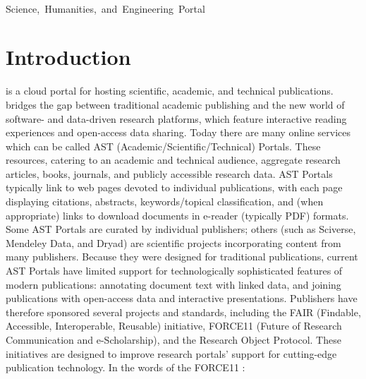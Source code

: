 \documentclass[10pt,letterpaper]{article}
\begin{document}
\vspace*{-6em}

\begin{center}
{}\\
\vspace{8pt}
\mbox{{\Large Science, Humanities, and Engineering Portal}}\\\vspace{3pt}
\end{center}

\vspace*{-2em}


\section{Introduction}
{\lfMOSAIC} is a cloud portal for hosting scientific, academic, and 
technical publications.  {\MOSAIC} bridges the gap between 
traditional academic publishing and the new 
world of software- and data-driven research platforms, 
which feature interactive reading experiences 
and open-access data sharing.
\p{}
Today there are many online services which 
can be called AST (Academic/Scientific/Technical) Portals.
These resources, catering 
to an academic and technical audience, aggregate 
research articles, books, journals, and publicly accessible 
research data.  
AST Portals typically link to web pages devoted to individual 
publications, with each page displaying citations, 
abstracts, keywords/topical classification, and 
(when appropriate) links to download documents  
in e-reader (typically PDF) formats.  
Some AST Portals are curated by 
individual publishers; others (such as Sciverse, Mendeley Data, 
and Dryad) are scientific projects  
incorporating content from many publishers.
\p{}
Because they were designed for traditional publications, 
current AST Portals have limited 
support for technologically sophisticated 
features of modern publications: annotating 
document text with linked data, and joining 
publications with open-access data and interactive 
presentations.  Publishers have therefore 
sponsored several projects and standards, including 
the FAIR (Findable, Accessible, Interoperable, 
Reusable) initiative, 
FORCE11 (Future of Research Communication and e-Scholarship), 
and the Research Object 
Protocol.  These initiatives are designed to 
improve research portals' support for cutting-edge 
publication technology.  In the 
words of the FORCE11 :
\qvspace{}
\end{document}
